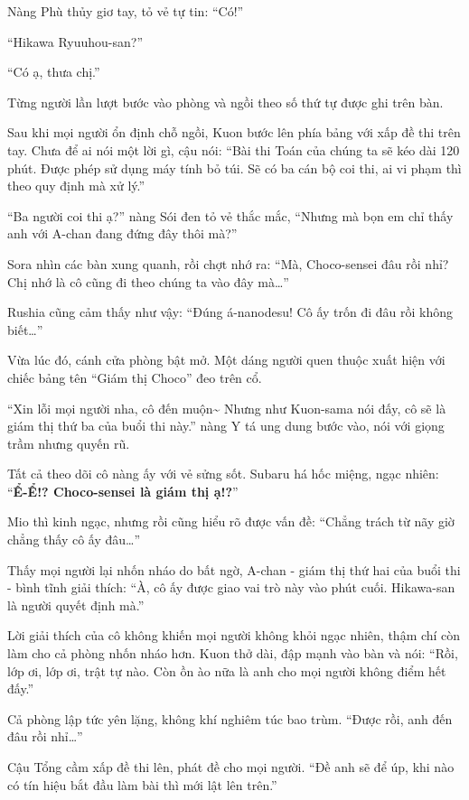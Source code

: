 \documentclass[../main.tex]{subfiles}
\begin{document}
Nàng Phù thủy giơ tay, tỏ vẻ tự tin: ``Có!''

``Hikawa Ryuuhou-san?''

``Có ạ, thưa chị.''

Từng người lần lượt bước vào phòng và ngồi theo số thứ tự được ghi trên bàn.

Sau khi mọi người ổn định chỗ ngồi, Kuon bước lên phía bảng với xấp đề thi trên tay. Chưa để ai nói một lời gì, cậu nói: ``Bài thi Toán của chúng ta sẽ kéo dài 120 phút. Được phép sử dụng máy tính bỏ túi. Sẽ có ba cán bộ coi thi, ai vi phạm thì theo quy định mà xử lý.''

``Ba người coi thi ạ?'' nàng Sói đen tỏ vẻ thắc mắc, ``Nhưng mà bọn em chỉ thấy anh với A-chan đang đứng đây thôi mà?''

Sora nhìn các bàn xung quanh, rồi chợt nhớ ra: ``Mà, Choco-sensei đâu rồi nhỉ? Chị nhớ là cô cũng đi theo chúng ta vào đây mà\dots''

Rushia cũng cảm thấy như vậy: ``Đúng á-nanodesu! Cô ấy trốn đi đâu rồi không biết\dots''

Vừa lúc đó, cánh cửa phòng bật mở. Một dáng người quen thuộc xuất hiện với chiếc bảng tên ``Giám thị Choco'' đeo trên cổ.

``Xin lỗi mọi người nha, cô đến muộn\~{} Nhưng như Kuon-sama nói đấy, cô sẽ là giám thị thứ ba của buổi thi này.'' nàng Y tá ung dung bước vào, nói với giọng trầm nhưng quyến rũ.

Tất cả theo dõi cô nàng ấy với vẻ sửng sốt. Subaru há hốc miệng, ngạc nhiên: ``\textbf{Ể-Ể!? Choco-sensei là giám thị ạ!?}''

Mio thì kinh ngạc, nhưng rồi cũng hiểu rõ được vấn đề: ``Chẳng trách từ nãy giờ chẳng thấy cô ấy đâu\dots''

Thấy mọi người lại nhốn nháo do bất ngờ, A-chan - giám thị thứ hai của buổi thi - bình tĩnh giải thích: ``À, cô ấy được giao vai trò này vào phút cuối. Hikawa-san là người quyết định mà.''

Lời giải thích của cô không khiến mọi người không khỏi ngạc nhiên, thậm chí còn làm cho cả phòng nhốn nháo hơn. Kuon thở dài, đập mạnh vào bàn và nói: ``Rồi, lớp ơi, lớp ơi, trật tự nào. Còn ồn ào nữa là anh cho mọi người không điểm hết đấy.''

Cả phòng lập tức yên lặng, không khí nghiêm túc bao trùm. ``Được rồi, anh đến đâu rồi nhỉ\dots''

Cậu Tổng cầm xấp đề thi lên, phát đề cho mọi người. ``Đề anh sẽ để úp, khi nào có tín hiệu bắt đầu làm bài thì mới lật lên trên.''
\end{document}
